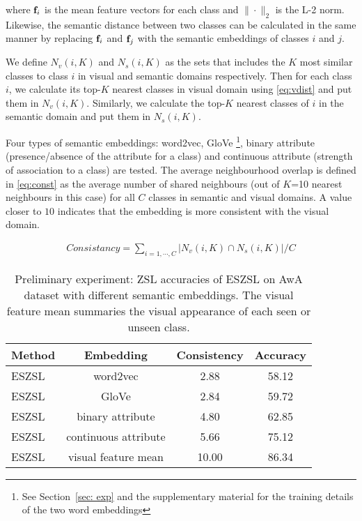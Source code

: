 \documentclass{bmvc2k}
\begin{document}
where ${\bf f}_i$ is the mean feature vectors for each class and $\|\cdot \|_2$ is the L-2 norm. Likewise, the semantic distance between two classes can be calculated in the same manner by replacing ${\bf f}_i$ and ${\bf f}_j$ with the semantic embeddings of classes $i$ and $j$.

We define $N_v(i, K)$ and $N_s(i, K)$ as the sets that includes the $K$ most similar classes to class $i$ in visual and semantic domains respectively.
Then for each class $i$, we calculate its top-$K$ nearest classes in visual domain using \eqref{eq:vdist} and put them in $N_v(i, K)$. Similarly, we calculate the top-$K$ nearest classes of $i$ in the semantic domain and put them in $N_s(i, K)$.

Four types of semantic embeddings: word2vec, GloVe \footnote{See Section~\ref{sec: exp} and the supplementary material for the training details of the two word embeddings}, binary attribute (presence/absence of the attribute for a class) and continuous attribute (strength of association to a class) are tested. The average neighbourhood overlap is defined in \eqref{eq:const} as the average number of shared neighbours (out of $K$=10 nearest neighbours in this case) for all $C$ classes in semantic and visual domains. A value closer to $10$ indicates that the embedding is more consistent with the visual domain.

\begin{align}\label{eq:const}
 Consistancy = \sum_{i=1, \cdots, C} {|N_v(i, K) \cap N_s(i, K) |} / C
\end{align}


\begin{table}[ht]
\begin{center}
\begin{tabular}{|l|c|c|c|}
\hline
Method &Embedding &Consistency  &Accuracy\\
\hline\hline
ESZSL   &word2vec &2.88 &58.12 \\
ESZSL  &GloVe &2.84  &59.72\\
ESZSL  &binary attribute &4.80   &62.85\\
ESZSL  &continuous attribute &5.66   &75.12\\
ESZSL  &visual feature mean &10.00 &86.34 \\

\hline
\end{tabular}
\end{center}
\caption{Preliminary experiment: ZSL accuracies of ESZSL on AwA dataset with different semantic embeddings. The visual feature mean summaries the visual appearance of each seen or unseen class. }
\label{tab: pre_test}
\end{table}
\end{document}
